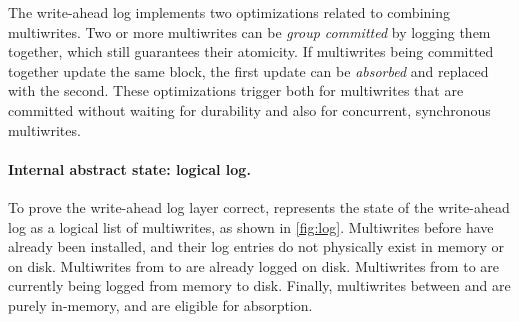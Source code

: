 The write-ahead log implements two optimizations related to combining
multiwrites. Two or more multiwrites can be \emph{group committed} by logging
them together, which still guarantees their atomicity. If multiwrites being
committed together update the same block, the first update can be
\emph{absorbed} and replaced with the second. These optimizations trigger both
for multiwrites that are committed without waiting for durability and also for
concurrent, synchronous multiwrites.

%




\paragraph{Internal abstract state: logical log.}
To prove the write-ahead log layer correct, \txn represents the
state of the write-ahead log as a logical list of multiwrites, as
shown in \cref{fig:log}.  Multiwrites before  have
already been installed, and their log entries do not physically exist in memory or on disk.
Multiwrites from  to  are already logged on
disk.  Multiwrites from  to  are currently being logged
from memory to disk.  Finally, multiwrites between 
and  are purely in-memory, and are eligible for absorption.

